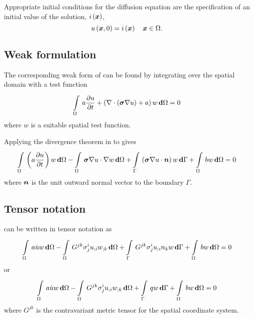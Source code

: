 Appropriate initial conditions for the diffusion equation are the
specification of an initial value of the solution, $ i\left( \boldsymbol{x} \right) $, \ie
\begin{equation}
  \fnof{u}{\vectr{x},0} = \fnof{i}{\vectr{x}} \quad \vectr{x}\in\Omega.
  \label{eqn:diffusionInitialC} 
\end{equation}

\subsection{Weak formulation}

The corresponding weak form of  can be found by
integrating over the spatial domain with a test function \ie
\begin{equation}
  \gint{\Omega}{}{a\delby{u}{t}+\pbrac{\divergence{}{\pbrac{\tensor{\sigma}
          \gradient{}{u}}}+a}w}{\Omega}=0
  \label{eqn:diffusionweakform1}
\end{equation}
where $w$ is a suitable spatial test function.

Applying the divergence theorem in 
to  gives
\begin{equation}
  \gint{\Omega}{}{\pbrac{a\delby{u}{t}}w}{\Omega}-
      \gint{\Omega}{}{\dotprod{\tensor{\sigma}\gradient{}{u}}{\gradient{}{w}}}{\Omega}
      +\gint{\Gamma}{}{\pbrac{\dotprod{\tensor{\sigma}\gradient{}{u}}{\normal}}w}{\Gamma}+
      \gint{\Omega}{}{bw}{\Omega}=0
  \label{eqn:diffusionweakform2}
\end{equation}
where $\boldsymbol{n}$ is the unit outward normal vector to the boundary $\Gamma$.

\subsection{Tensor notation}

 can be written in tensor notation as
\begin{equation}
  \gint{\Omega}{}{a\dot{u}w}{\Omega}-
  \gint{\Omega}{}{G^{jk}\sigma^{i}_{j}\covarderiv{u}{i}\covarderiv{w}{k}}{\Omega}+
  \gint{\Gamma}{}{G^{jk}\sigma^{i}_{j}\covarderiv{u}{i}n_{k}w}{\Gamma} +
  \gint{\Omega}{}{bw}{\Omega}=0
  \label{eqn:diffusiontensorform1}
\end{equation}
or
\begin{equation}
  \gint{\Omega}{}{a\dot{u}w}{\Omega}-
  \gint{\Omega}{}{G^{jk}\sigma^{i}_{j}\covarderiv{u}{i}\covarderiv{w}{k}}{\Omega}+
  \gint{\Gamma}{}{qw}{\Gamma} +
  \gint{\Omega}{}{bw}{\Omega}=0
  \label{eqn:diffusiontensorform2}
\end{equation}
where $G^{jk}$ is the contravariant metric tensor for the spatial coordinate system.

